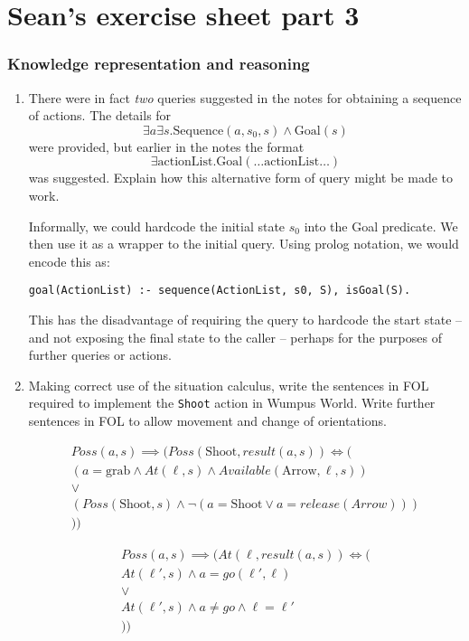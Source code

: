 \documentclass[10pt,\jkfside,a4paper]{article}
\begin{document}
\part{Sean's exercise sheet part 3}

\section{Knowledge representation and reasoning}

\begin{enumerate}

\item There were in fact \textit{two} queries suggested in the notes for
obtaining a sequence of actions. The details for
\[
\exists a \exists s. \text{Sequence}(a, s_0, s) \wedge \text{Goal}(s)
\]
were provided, but earlier in the notes the format
\[
\exists \text{actionList}.\text{Goal}(\dots \text{actionList}\dots)
\]
was suggested. Explain how this alternative form of query might be made to
work.

Informally, we could hardcode the initial state $s_0$ into the Goal
predicate. We then use it as a wrapper to the initial query. Using prolog
notation, we would encode this as:

\begin{lstlisting}[style=pstyle]
goal(ActionList) :- sequence(ActionList, s0, S), isGoal(S).
\end{lstlisting}

This has the disadvantage of requiring the query to hardcode the start state
-- and not exposing the final state to the caller -- perhaps for the
purposes of further queries or actions.

\item Making correct use of the situation calculus, write the sentences in
FOL required to implement the \texttt{Shoot} action in Wumpus World. Write
further sentences in FOL to allow movement and change of orientations.

\begin{gather*}
Poss(a, s) \implies (Poss(\text{Shoot}, result(a, s)) \iff (
\\
(a = \text{grab} \wedge At(\ell, s) \wedge Available(\text{Arrow}, \ell, s))\\
\vee \\
(Poss(\text{Shoot}, s) \wedge \neg (a = \text{Shoot} \vee a = release(Arrow)))
\\
))
\end{gather*}

\begin{gather*}
Poss(a, s) \implies (
At(\ell, result(a, s)) \iff (
\\
At(\ell', s) \wedge a = go(\ell', \ell)
\\
\vee \\
At(\ell', s) \wedge a \neq go \wedge \ell = \ell'
\\
))
\end{gather*}


\end{enumerate}
\end{document}
